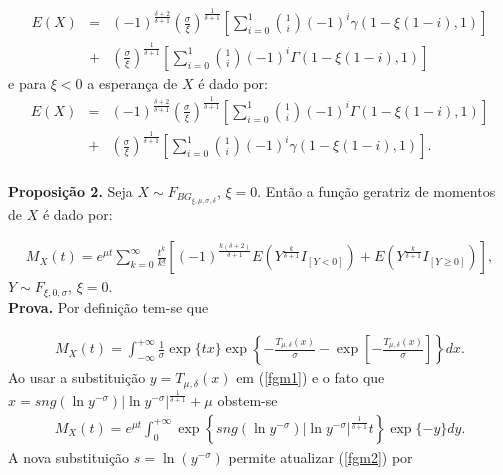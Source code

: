 \documentclass[pdftex,11pt]{article}%
\numberwithin{equation}{section} %
\begin{document}
\begin{eqnarray}\label{mediaxi>}
	E(X)&=& (-1)^{\frac{\delta+2}{\delta+1}} \left(\frac{\sigma}{\xi}\right)^{\frac{1}{\delta+1}} \left[ \sum_{i=0}^{1} \binom{1}{i}(-1)^{i} \gamma \left(1-\xi \left( 1 -i \right), 1 \right)\right] \nonumber\\
	&+&   \left(\frac{\sigma}{\xi}\right)^{\frac{1}{\delta+1}} \left[ \sum_{i=0}^{1} \binom{1}{i}(-1)^{i} \Gamma \left(1-\xi \left( 1 -i \right), 1 \right)\right]
\end{eqnarray}
e para $\xi< 0$  a esperança de  $X$ é  dado por:
\begin{eqnarray}\label{mediaxi<}
	E(X)&=& (-1)^{\frac{\delta+2}{\delta+1}} \left(\frac{\sigma}{\xi}\right)^{\frac{1}{\delta+1}} \left[ \sum_{i=0}^{1} \binom{1}{i}(-1)^{i} \Gamma \left(1-\xi \left( 1 -i \right), 1 \right)\right] \nonumber\\
	&+&   \left(\frac{\sigma}{\xi}\right)^{\frac{1}{\delta+1}} \left[ \sum_{i=0}^{1} \binom{1}{i}(-1)^{i} \gamma \left(1-\xi \left( 1 -i \right), 1 \right)\right].
\end{eqnarray}
\vspace{1cm}\\
\textbf{Proposição 2.}
Seja $X\sim F_{BG_{\xi,\mu,\sigma, \delta}}$, $\xi=0$. Então a função geratriz de momentos de  $X$ é  dado por:

\begin{eqnarray}\label{fgm}
	M_{X} (t)={e^{\mu t}} \sum_{k=0}^{\infty} \frac{t^{k}}{k!} \left[(-1)^{\frac{k(\delta+2)}{\delta+1}}   E\left(Y^{\frac{k}{\delta+1}} I_{[Y<0]}\right)
	 + E\left(Y^{\frac{k}{\delta+1}} I_{[Y\geq 0]}\right)\right],
\end{eqnarray}
$Y\sim F_{\xi, 0, \sigma}$, $\xi=0$.
\\
\textbf{Prova.}
Por definição tem-se que

\begin{eqnarray}\label{fgm1}
M_{X} (t)=\int_{-\infty}^{+\infty}  \frac{1}{\sigma} \exp\{tx \}\exp\left\{ -\frac{T_{\mu, \delta}(x)}{\sigma}-\exp \left[-\frac{T_{\mu, \delta}(x)}{\sigma}  \right]	\right\} dx.
\end{eqnarray}
Ao usar a substituição $y=T_{\mu, \delta}(x)$ em (\ref{fgm1})
 e o fato que $x=sng(\ln y^{-\sigma} )|\ln y^{-\sigma}|^{\frac{1}{\delta+1}}+\mu $ obstem-se
 \begin{eqnarray}\label{fc2}
 	M_{X} (t)= e^{\mu t} \int_{0}^{+\infty} \exp\left\{sng(\ln y^{-\sigma} )|\ln y^{-\sigma}|^{\frac{1}{\delta+1}} t	\right\} \exp\{ -y \} dy.
 \end{eqnarray}
 A nova substituição $s=\ln(y^{-\sigma})$ permite atualizar (\ref{fgm2}) por
 
\end{document}
